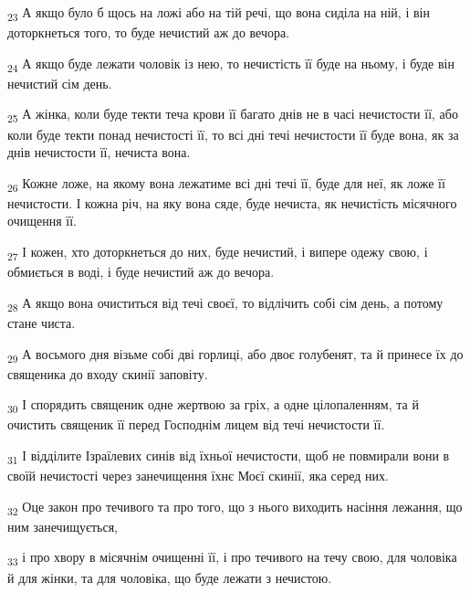 \begin{tcolorbox}
\textsubscript{23} А якщо було б щось на ложі або на тій речі, що вона сиділа на ній, і він доторкнеться того, то буде нечистий аж до вечора.
\end{tcolorbox}
\begin{tcolorbox}
\textsubscript{24} А якщо буде лежати чоловік із нею, то нечистість її буде на ньому, і буде він нечистий сім день.
\end{tcolorbox}
\begin{tcolorbox}
\textsubscript{25} А жінка, коли буде текти теча крови її багато днів не в часі нечистости її, або коли буде текти понад нечистості її, то всі дні течі нечистости її буде вона, як за днів нечистости її, нечиста вона.
\end{tcolorbox}
\begin{tcolorbox}
\textsubscript{26} Кожне ложе, на якому вона лежатиме всі дні течі її, буде для неї, як ложе її нечистости. І кожна річ, на яку вона сяде, буде нечиста, як нечистість місячного очищення її.
\end{tcolorbox}
\begin{tcolorbox}
\textsubscript{27} І кожен, хто доторкнеться до них, буде нечистий, і випере одежу свою, і обмиється в воді, і буде нечистий аж до вечора.
\end{tcolorbox}
\begin{tcolorbox}
\textsubscript{28} А якщо вона очиститься від течі своєї, то відлічить собі сім день, а потому стане чиста.
\end{tcolorbox}
\begin{tcolorbox}
\textsubscript{29} А восьмого дня візьме собі дві горлиці, або двоє голубенят, та й принесе їх до священика до входу скинії заповіту.
\end{tcolorbox}
\begin{tcolorbox}
\textsubscript{30} І спорядить священик одне жертвою за гріх, а одне цілопаленням, та й очистить священик її перед Господнім лицем від течі нечистости її.
\end{tcolorbox}
\begin{tcolorbox}
\textsubscript{31} І відділите Ізраїлевих синів від їхньої нечистости, щоб не повмирали вони в своїй нечистості через занечищення їхнє Моєї скинії, яка серед них.
\end{tcolorbox}
\begin{tcolorbox}
\textsubscript{32} Оце закон про течивого та про того, що з нього виходить насіння лежання, що ним занечищується,
\end{tcolorbox}
\begin{tcolorbox}
\textsubscript{33} і про хвору в місячнім очищенні її, і про течивого на течу свою, для чоловіка й для жінки, та для чоловіка, що буде лежати з нечистою.
\end{tcolorbox}
